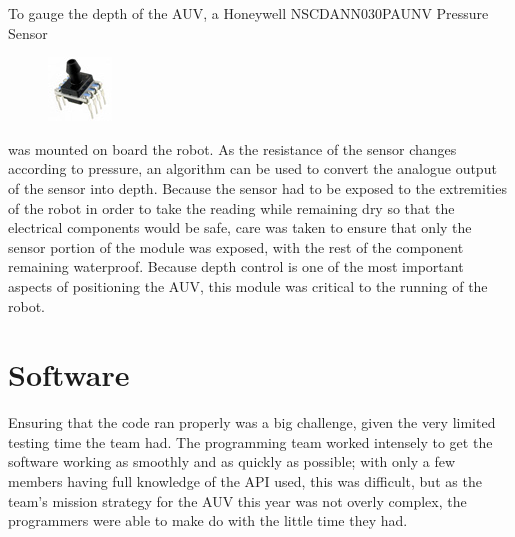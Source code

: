 \documentclass[12pt, letterpaper, twocolumn, titlepage]{article}
\begin{document}
To gauge the depth of the AUV, a Honeywell NSCDANN030PAUNV Pressure Sensor
\begin{figure}
	\vspace{-30pt}
 	\flushright
   	\includegraphics[width=0.3\columnwidth]{Pressure}
   	\vspace{-30pt}
\end{figure}
was mounted on board the robot. As the resistance of the sensor changes according to pressure, an algorithm can be used to convert the analogue output of the sensor into depth. Because the sensor had to be exposed
to the extremities of the robot in order to take the reading while remaining dry so that the electrical components would be safe, care was taken to ensure that only the sensor portion of the module was exposed, with the rest of the component remaining waterproof. Because depth control is one of the most important aspects of positioning the AUV, this module was critical to the running of the robot.

\section{Software}

Ensuring that the code ran properly was a big challenge, given the very limited testing time the team had. The programming team worked intensely to get the software working as smoothly and as quickly as possible; with only a few members having full knowledge of the API used, this was difficult, but as the team's mission strategy for the AUV this year was not overly complex, the programmers were able to make do with the little time they had.
\end{document}
